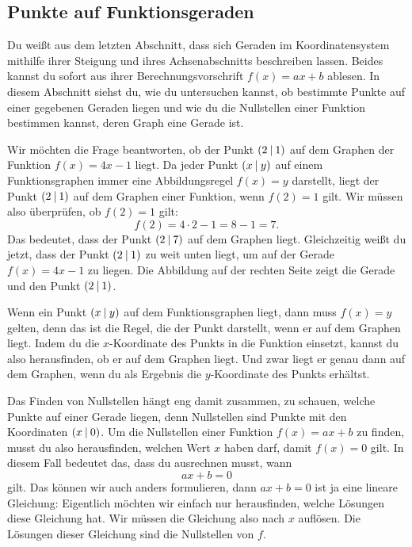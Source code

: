 \documentclass[../../main.tex]{subfiles}
\begin{document}
\subsection{Punkte auf Funktionsgeraden}

Du weißt aus dem letzten Abschnitt, dass sich Geraden im Koordinatensystem mithilfe ihrer Steigung und ihres Achsenabschnitts beschreiben lassen. Beides kannst du sofort aus ihrer Berechnungsvorschrift $f(x)=ax+b$ ablesen. In diesem Abschnitt siehst du, wie du untersuchen kannst, ob bestimmte Punkte auf einer gegebenen Geraden liegen und wie du die Nullstellen einer Funktion bestimmen kannst, deren Graph eine Gerade ist.

\begin{example}{}
    Wir möchten die Frage beantworten, ob der Punkt $\left(2 \:\middle|\: 1\right)$ auf dem Graphen der Funktion $f(x)=4x-1$ liegt. Da jeder Punkt $\left(x \:\middle|\: y\right)$ auf einem Funktionsgraphen immer eine Abbildungsregel $f(x)=y$ darstellt, liegt der Punkt $\left(2 \:\middle|\: 1\right)$ auf dem Graphen einer Funktion, wenn $f(2)=1$ gilt. Wir müssen also überprüfen, ob $f(2)=1$ gilt:
    \[f(2)=4\cdot 2-1=8-1=7.\]
    Das bedeutet, dass der Punkt $\left(2 \:\middle|\: 7\right)$ auf dem Graphen liegt. Gleichzeitig weißt du jetzt, dass der Punkt $\left(2 \:\middle|\: 1\right)$ zu weit unten liegt, um auf der Gerade $f(x)=4x-1$ zu liegen. Die Abbildung auf der rechten Seite zeigt die Gerade und den Punkt $\left(2 \:\middle|\: 1\right)$.
\end{example}

Wenn ein Punkt $\left(x \:\middle|\: y\right)$ auf dem Funktionsgraphen liegt, dann muss $f(x)=y$ gelten, denn das ist die Regel, die der Punkt darstellt, wenn er auf dem Graphen liegt. Indem du die $x$-Koordinate des Punkts in die Funktion einsetzt, kannst du also herausfinden, ob er auf dem Graphen liegt. Und zwar liegt er genau dann auf dem Graphen, wenn du als Ergebnis die $y$-Koordinate des Punkts erhältst.

Das Finden von Nullstellen hängt eng damit zusammen, zu schauen, welche Punkte auf einer Gerade liegen, denn Nullstellen sind Punkte mit den Koordinaten $\left(x \:\middle|\: 0\right)$. Um die Nullstellen einer Funktion $f(x)=ax+b$ zu finden, musst du also herausfinden, welchen Wert $x$ haben darf, damit $f(x)=0$ gilt. In diesem Fall bedeutet das, dass du ausrechnen musst, wann 
\[ax+b=0\] 
gilt. Das können wir auch anders formulieren, dann $ax+b=0$ ist ja eine lineare Gleichung: Eigentlich möchten wir einfach nur herausfinden, welche Lösungen diese Gleichung hat. Wir müssen die Gleichung also nach $x$ auflösen. Die Lösungen dieser Gleichung sind die Nullstellen von $f$.
\end{document}
